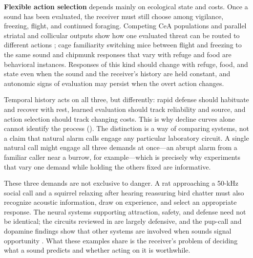 \textbf{Flexible action selection} depends mainly on ecological state and costs. Once a sound has been evaluated, the receiver must still choose among vigilance, freezing, flight, and continued foraging. Competing CeA populations and parallel striatal and collicular outputs show how one evaluated threat can be routed to different actions \citep{FadokEtAl2017,TovoteEtAl2016,LiEtAl2021}; cage familiarity switching mice between flight and freezing to the same sound \citep{MongeauEtAl2003} and chipmunk responses that vary with refuge and food \citep{BaackSwitzer2000} are behavioral instances. Responses of this kind should change with refuge, food, and state even when the sound and the receiver's history are held constant, and autonomic signs of evaluation may persist when the overt action changes.

Temporal history acts on all three, but differently: rapid defense should habituate and recover with rest, learned evaluation should track reliability and source, and action selection should track changing costs. This is why decline curves alone cannot identify the process (). The distinction is a way of comparing systems, not a claim that natural alarm calls engage any particular laboratory circuit. A single natural call might engage all three demands at once---an abrupt alarm from a familiar caller near a burrow, for example---which is precisely why experiments that vary one demand while holding the others fixed are informative.

These three demands are not exclusive to danger. A rat approaching a 50-kHz social call \citep{WilluhnEtAl2014} and a squirrel relaxing after hearing reassuring bird chatter \citep{LillyEtAl2019} must also recognize acoustic information, draw on experience, and select an appropriate response. The neural systems supporting attraction, safety, and defense need not be identical; the circuits reviewed in  are largely defensive, and the pup-call and dopamine findings show that other systems are involved when sounds signal opportunity \citep{MarlinEtAl2015,WilluhnEtAl2014}. What these examples share is the receiver's problem of deciding what a sound predicts and whether acting on it is worthwhile.

